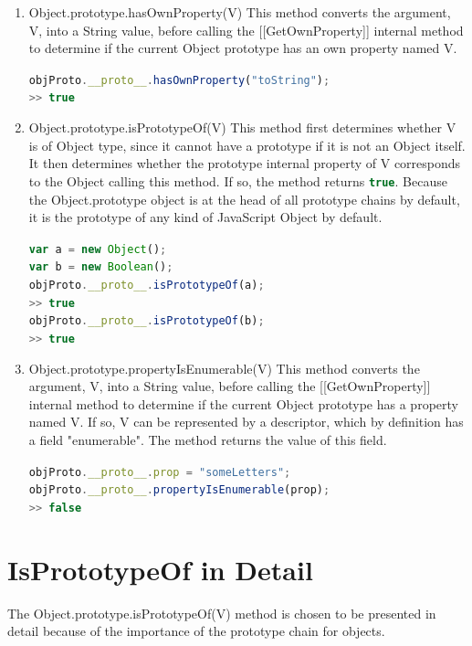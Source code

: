 \documentclass[a4paper,11pt,twoside]{report}
\def\jsinline{\lstinline[language=JavaScript, basicstyle=\small]}%\end{lstlisting}
\begin{document}
\begin{enumerate}
\item Object.prototype.hasOwnProperty(V) \newline
This method converts the argument, V, into a String value, before calling the [[GetOwnProperty]] internal method to determine if the current Object prototype has an own property named V.

\jsinline|objProto.__proto__.hasOwnProperty("toString");|\\
\jsinline|>> true|

\item Object.prototype.isPrototypeOf(V) \newline
This method first determines whether V is of Object type, since it cannot have a prototype if it is not an Object itself. It then determines whether the prototype internal property of V corresponds to the Object calling this method. If so, the method returns \jsinline|true|. Because the Object.prototype object is at the head of all prototype chains by default, it is the prototype of any kind of JavaScript Object by default.

\jsinline|var a = new Object();| \\
\jsinline|var b = new Boolean();| \\
\jsinline|objProto.__proto__.isPrototypeOf(a);| \\
\jsinline|>> true| \\
\jsinline|objProto.__proto__.isPrototypeOf(b);| \\
\jsinline|>> true|

\item Object.prototype.propertyIsEnumerable(V) \newline
This method converts the argument, V, into a String value, before calling the [[GetOwnProperty]] internal method to determine if the current Object prototype has a property named V. If so, V can be represented by a descriptor, which by definition has a field "enumerable". The method returns the value of this field.

\jsinline|objProto.__proto__.prop = "someLetters";| \\
\jsinline|objProto.__proto__.propertyIsEnumerable(prop);| \\
\jsinline|>> false|

\end{enumerate}

\section{IsPrototypeOf in Detail}
The Object.prototype.isPrototypeOf(V) method is chosen to be presented in detail because of the importance of the prototype chain for objects. 
\end{document}
